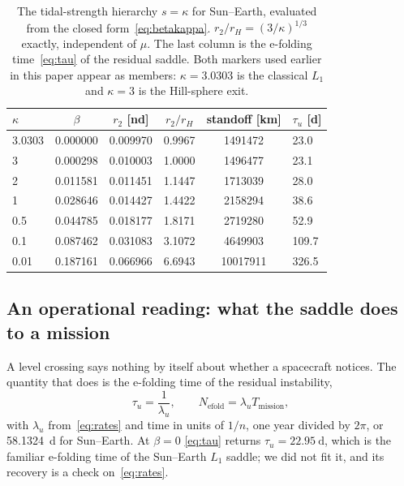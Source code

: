 \documentclass[pdflatex,sn-mathphys-num]{sn-jnl}
\begin{document}
\begin{table}[t]
  \centering
  \caption{The tidal-strength hierarchy $s=\kappa$ for Sun--Earth, evaluated
  from the closed form~\eqref{eq:betakappa}. $r_2/r_H=(3/\kappa)^{1/3}$ exactly,
  independent of $\mu$. The last column is the e-folding
  time~\eqref{eq:tau} of the residual saddle. Both markers used earlier in this
  paper appear as members: $\kappa=3.0303$ is the classical $L_1$ and
  $\kappa=3$ is the Hill-sphere exit.}
  \label{tab:hierarchy}
  \begin{tabular}{lccccl}
    \toprule
    $\kappa$ & $\beta$ & $r_2$ [nd] & $r_2/r_H$ &
    standoff [\si{\kilo\metre}] & $\tau_u$ [d] \\
    \midrule
    \num{3.0303} & \num{0.000000} & \num{0.009970} & \num{0.9967} & \num{1491472} & \num{23.0} \\
    \num{3}      & \num{0.000298} & \num{0.010003} & \num{1.0000} & \num{1496477} & \num{23.1} \\
    \num{2}      & \num{0.011581} & \num{0.011451} & \num{1.1447} & \num{1713039} & \num{28.0} \\
    \num{1}      & \num{0.028646} & \num{0.014427} & \num{1.4422} & \num{2158294} & \num{38.6} \\
    \num{0.5}    & \num{0.044785} & \num{0.018177} & \num{1.8171} & \num{2719280} & \num{52.9} \\
    \num{0.1}    & \num{0.087462} & \num{0.031083} & \num{3.1072} & \num{4649903} & \num{109.7} \\
    \num{0.01}   & \num{0.187161} & \num{0.066966} & \num{6.6943} & \num{10017911}& \num{326.5} \\
    \bottomrule
  \end{tabular}
\end{table}

\subsection{An operational reading: what the saddle does to a mission}
\label{sec:operational}

A level crossing says nothing by itself about whether a spacecraft notices.
The quantity that does is the e-folding time of the residual instability,
\begin{equation}
  \tau_u = \frac{1}{\lambda_u}, \qquad
  N_{\mathrm{efold}} = \lambda_u T_{\mathrm{mission}} ,
  \label{eq:tau}
\end{equation}
with $\lambda_u$ from~\eqref{eq:rates} and time in units of $1/n$, one year
divided by $2\pi$, or \SI{58.1324}{\day} for Sun--Earth. At $\beta=0$
\eqref{eq:tau} returns $\tau_u=\SI{22.95}{\day}$, which is the familiar
e-folding time of the Sun--Earth $L_1$ saddle; we did not fit it, and its
recovery is a check on~\eqref{eq:rates}.
\end{document}
